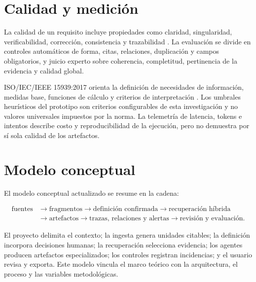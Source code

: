 \section{Calidad y medición}

La calidad de un requisito incluye propiedades como claridad, singularidad, verificabilidad, corrección, consistencia y trazabilidad \cite{iso29148}. La evaluación se divide en controles automáticos de forma, citas, relaciones, duplicación y campos obligatorios, y juicio experto sobre coherencia, completitud, pertinencia de la evidencia y calidad global.

ISO/IEC/IEEE 15939:2017 orienta la definición de necesidades de información, medidas base, funciones de cálculo y criterios de interpretación \cite{iso15939}. Los umbrales heurísticos del prototipo son criterios configurables de esta investigación y no valores universales impuestos por la norma. La telemetría de latencia, tokens e intentos describe costo y reproducibilidad de la ejecución, pero no demuestra por sí sola calidad de los artefactos.

\section{Modelo conceptual}

El modelo conceptual actualizado se resume en la cadena:

\begin{align}
  \text{fuentes} &\rightarrow \text{fragmentos}
  \rightarrow \text{definición confirmada}
  \rightarrow \text{recuperación híbrida} \nonumber\\
  &\rightarrow \text{artefactos}
  \rightarrow \text{trazas, relaciones y alertas}
  \rightarrow \text{revisión y evaluación}. \nonumber
\end{align}

El proyecto delimita el contexto; la ingesta genera unidades citables; la definición incorpora decisiones humanas; la recuperación selecciona evidencia; los agentes producen artefactos especializados; los controles registran incidencias; y el usuario revisa y exporta. Este modelo vincula el marco teórico con la arquitectura, el proceso y las variables metodológicas.
